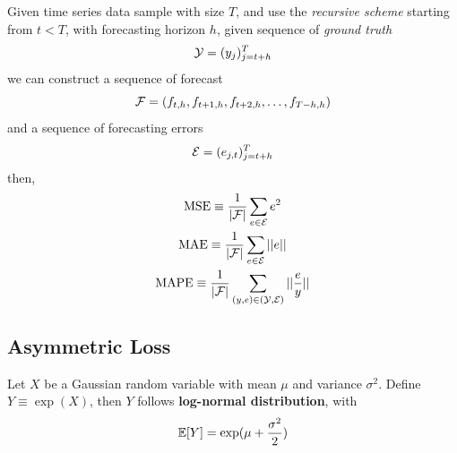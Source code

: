 \documentclass[11pt]{article}
\begin{document}
			\begin{definition}
				Given time series data sample with size $T$, and use the \emph{recursive scheme} starting from $t < T$, with forecasting horizon $h$, given sequence of \emph{ground truth}
				\begin{equation}
					\mathcal{{Y}} = (y_j)_{j=t+h}^T
				\end{equation}
				we can construct a sequence of forecast
				\begin{equation}
					\mathcal{{F}} = (f_{t, h}, f_{t+1, h}, f_{t+2, h}, \dots, f_{T-h, h})
				\end{equation}
				and a sequence of forecasting errors
				\begin{equation}
					\mathcal{{E}} = (e_{j, t})_{j=t+h}^T
				\end{equation}
				then,
				\begin{gather}
					\text{{MSE}} \equiv \frac{1}{|\mathcal{{F}}|} \sum_{e \in \mathcal{{E}}} e^2 \\
					\text{{MAE}} \equiv \frac{1}{|\mathcal{{F}}|} \sum_{e \in \mathcal{{E}}} \vert \vert {e} \vert \vert \\
					\text{{MAPE}} \equiv \frac{1}{|\mathcal{{F}}|} \sum_{(y,e) \in (\mathcal{{Y}}, \mathcal{{E}})} \vert \vert {\frac{e}{y}} \vert \vert
				\end{gather}
			\end{definition}
		\subsection{Asymmetric Loss}
			\begin{definition}
				Let $X$ be a Gaussian random variable with mean $\mu$ and variance $\sigma^2$. Define $Y \equiv \exp(X)$, then $Y$ follows \textbf{log-normal distribution}, with 
				\begin{equation}
					\mathbb{E}[{Y}] = \exp(\mu + \frac{\sigma^2}{2})
				\end{equation}
			\end{definition}
			
\end{document}
